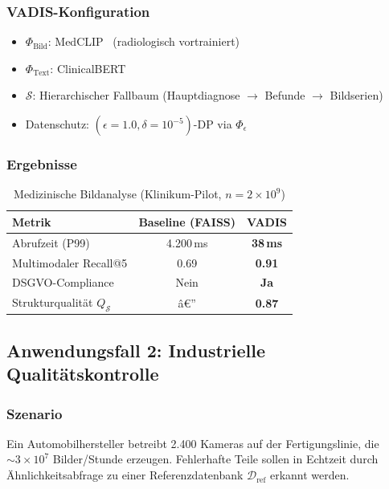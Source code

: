 ﻿\documentclass[12pt,a4paper]{article}
\begin{document}
\subsubsection{VADIS-Konfiguration}

\begin{itemize}[leftmargin=1.2em, itemsep=1pt]
  \item $\Phi_{\text{Bild}}$: MedCLIP~\cite{wang2022medclip}
        (radiologisch vortrainiert)
  \item $\Phi_{\text{Text}}$: ClinicalBERT~\cite{alsentzer2019clinicalbert}
  \item $\mathcal{S}$: Hierarchischer Fallbaum (Hauptdiagnose $\to$
        Befunde $\to$ Bildserien)
  \item Datenschutz: $(\epsilon=1.0, \delta=10^{-5})$-DP via
        $\Phi_\epsilon$
\end{itemize}

\subsubsection{Ergebnisse}

\begin{table}[ht]
\centering
\small
\caption{Medizinische Bildanalyse (Klinikum-Pilot, $n=2\times10^9$)}
\label{tab:medical}
\begin{tabular}{@{}lcc@{}}
\toprule
\textbf{Metrik} & \textbf{Baseline (FAISS)} & \textbf{VADIS} \\
\midrule
Abrufzeit (P99) & 4.200\,ms & \textbf{38\,ms} \\
Multimodaler Recall@5 & 0.69 & \textbf{0.91} \\
DSGVO-Compliance & Nein & \textbf{Ja} \\
Strukturqualität $Q_\mathcal{S}$ & â€” & \textbf{0.87} \\
\bottomrule
\end{tabular}
\end{table}

\subsection{Anwendungsfall 2: Industrielle Qualitätskontrolle}

\subsubsection{Szenario}
Ein Automobilhersteller betreibt 2.400 Kameras auf der Fertigungslinie,
die $\sim 3 \times 10^7$ Bilder/Stunde erzeugen. Fehlerhafte Teile
sollen in Echtzeit durch Ähnlichkeitsabfrage zu einer
Referenzdatenbank $\mathcal{D}_{\text{ref}}$ erkannt werden.
\end{document}
